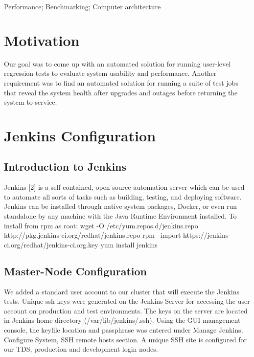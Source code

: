 \documentclass[10pt, conference, compsocconf]{IEEEtran}
\begin{document}
\begin{IEEEkeywords}
Performance; Benchmarking; Computer architecture
\end{IEEEkeywords}


%
\IEEEpeerreviewmaketitle

\section{Motivation}
Our goal was to come up with an automated solution for running user-level regression tests to evaluate system usability and performance. Another requirement was to find an automated solution for running a suite of test jobs that reveal the system health after upgrades and outages before returning the system to service.
\section{Jenkins Configuration}
\label{sec:JenkinsConfiguration}

\subsection{Introduction to Jenkins}
Jenkins [2] is a self-contained, open source automation server which can be used to automate all sorts of tasks such as building, testing, and deploying software. Jenkins can be installed through native system packages, Docker, or even run standalone by any machine with the Java Runtime Environment installed. 
To install from rpm as root:
wget -O /etc/yum.repos.d/jenkins.repo http://pkg.jenkins-ci.org/redhat/jenkins.repo
rpm --import https://jenkins-ci.org/redhat/jenkins-ci.org.key
yum install jenkins
\subsection{Master-Node Configuration}
We added a standard user account to our cluster that will execute the Jenkins tests. Unique ssh keys were generated on the Jenkins Server for accessing the user account on production and test environments.  The keys on the server are located in Jenkins home directory (/var/lib/jenkins/.ssh). Using the GUI management console, the keyfile location and passphrase was entered under Manage Jenkins, Configure System, SSH remote hosts section. A unique SSH site is configured for our TDS, production and development login nodes.   
\end{document}
